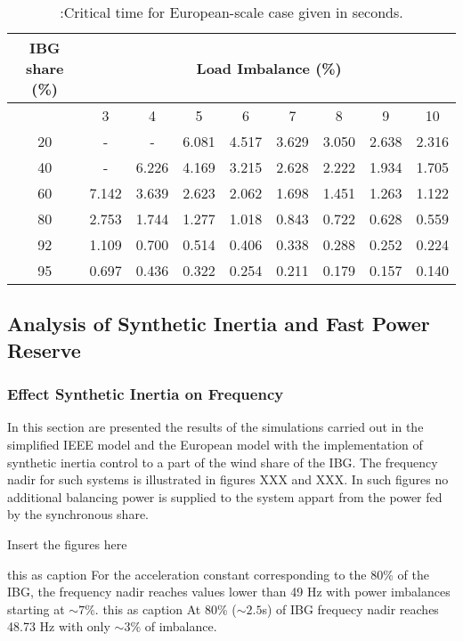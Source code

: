 \begin{table}[h]
	\caption{\label{tb:crtime}:Critical time for European-scale case given in seconds.}
	\centering
	\begin{tabular}{*9c}
		\toprule
		\textbf{IBG share (\%)}	& \multicolumn{8}{c}{\textbf{Load Imbalance (\%)}} \\
		\midrule
		{} & 3&	4&	5&	6&	7&	8&	9	&10 \\
		\midrule
		20&	-&	-&	6.081&	4.517&	3.629&	3.050&	2.638&	2.316\\
		40&	-&	6.226&	4.169&	3.215&	2.628&	2.222&	1.934&	1.705\\
		60	&7.142&	3.639&	2.623&	2.062&	1.698&	1.451&	1.263&	1.122\\
		80&	2.753&	1.744&	1.277&	1.018&	0.843&	0.722&	0.628&	0.559\\
		92&	1.109&	0.700&	0.514&	0.406&	0.338&	0.288&	0.252&	0.224\\
		95&	0.697&	0.436&	0.322&	0.254&	0.211&	0.179&	0.157&	0.140\\
	\end{tabular}
\end{table}


\subsection{Analysis of Synthetic Inertia and Fast Power Reserve}

\subsubsection{Effect Synthetic Inertia on Frequency}

In this section are presented the results of the simulations carried out in the simplified IEEE model and the European model with the implementation of synthetic inertia control to a part of the wind share of the IBG. The frequency nadir for such systems is illustrated in figures XXX and XXX. In such figures no additional balancing power is supplied to the system appart from the power fed by the synchronous share. 



Insert the figures here

this as caption For the acceleration constant corresponding to the 80\% of the IBG, the frequency nadir reaches values lower than 49 Hz with power imbalances starting at $ \sim 7\% $.
this as caption At 80\% ($\sim2.5$s) of IBG frequecy nadir reaches 48.73 Hz with only $\sim 3\% $ of imbalance. 


